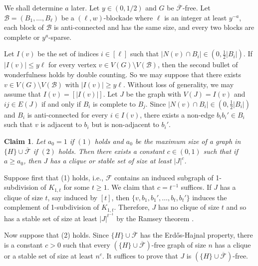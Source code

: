 \documentclass[a4paper,11pt]{article}
\newtheorem{claim}{Claim}[theorem]
\let\oldendproof\endproof
\renewenvironment{proof}[1][\proofname]{%
	\oldproof[\normalfont\bfseries #1]%
}{\oldendproof}
\renewcommand{\qedsymbol}{$\square$}%
\newenvironment{subproof}[1][\normalfont\it Subproof]{%
	\renewcommand{\qedsymbol}{{\tiny{$\blacksquare$}}}%
	\begin{proof}[#1]%
	}{%
	\end{proof}%
}
\begin{document}
\begin{proof}   
    We shall determine $a$ later.
    Let $y\in (0,1/2)$ and  $G$ be $\overline{\mathcal{F}}$-free.
    Let $\mathcal{B}=(B_1,\ldots,B_\ell)$ be a $(\ell,w)$-blockade where $\ell$ is an integer at least $y^{-a}$, each block of $\mathcal{B}$ is anti-connected and has the same size, and every two blocks are complete or $y^{a}$-sparse.
    
    Let $I(v)$ be the set of indices $i\in[\ell]$ such that $|N(v)\cap B_i|\in(0,\frac{1}{2}|B_i|)$.
    If $|I(v)|\leq y\ell$ for every vertex $v\in V(G)\setminus V(\mathcal{B})$, then  
    the second bullet of wonderfulness holds by double counting. 
    So we may suppose that there exists $v\in V(G)\setminus V(\mathcal{B})$ with $|I(v)|\geq y\ell$. 
    Without loss of generality, we may assume that $I(v)=[|I(v)|]$. 
    Let $J$ be the graph with $V(J)=I(v)$ and $ij\in E(J)$ if and only if $B_i$ is complete to $B_j$. Since $|N(v)\cap B_i|\in (0,\frac{1}{2}|B_i|)$ and $B_i$ is anti-connected for every $i\in I(v)$, there exists a non-edge $b_ib_i'\in B_i$ such that $v$ is adjacent to $b_i$ but is non-adjacent to $b_i'$.

    \begin{claim}\label{clm:pattern-EH}
        Let $a_0=1$ if $(1)$ holds and $a_0$ be the maximum size of a graph in $\{H\}\cup \overline{\mathcal{F}}$ if $(2)$ holds. 
        Then there exists a constant $c\in (0,1)$ such that if $a\geq a_0$, then $J$ has a clique or stable set of size at least $|J|^c$.
    \end{claim}
    
    \begin{subproof}[Proof of Claim \ref{clm:pattern-EH}]
        Suppose first that (1) holds, i.e., $\mathcal{F}$ contains an induced subgraph of 1-subdivision of $K_{1,t}$ for some $t\geq 1$.
        We claim that $c=t^{-1}$ suffices. 
        If $J$ has a clique of size $t$, say induced by $[t]$, then $\{v,b_1,b_1',\ldots,b_t,b_t'\}$ induces the complement of 1-subdivision of $K_{1,t}$. 
        Therefore, $J$ has no clique of size $t$ and so has a stable set of size at least $|J|^{t^{-1}}$ by the Ramsey theorem \cite{ES35}. 

        Now suppose that (2) holds. 
        Since $\{H\}\cup \overline{\mathcal{F}}$ has the Erd\H{o}s-Hajnal property, there is a constant $c>0$ such that every $(\{H\}\cup \overline{\mathcal{F}})$-free graph of size $n$ has a clique or a stable set of size at least $n^{c}$.
        It suffices to prove that $J$ is $(\{H\}\cup \overline{\mathcal{F}})$-free. 


\end{subproof}
\end{proof}
\end{document}
